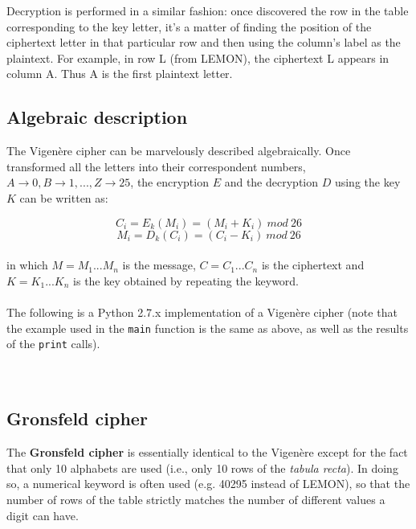 \documentclass[Lau,binding=0.6cm,oneside]{sapthesis}
\begin{document}
Decryption is performed in a similar fashion: once discovered the row in the table corresponding to the key letter, it's a matter of finding the position of the ciphertext letter in that particular row and then using the column's label as the plaintext. For example, in row \textsf{L} (from \textsf{LEMON}), the ciphertext \textsf{L} appears in column \textsf{A}. Thus \textsf{A} is the first plaintext letter.

\subsection{Algebraic description}
The Vigenère cipher can be marvelously described algebraically. Once transformed all the letters into their correspondent numbers, $A \rightarrow 0, B \rightarrow 1, ... , Z \rightarrow 25$, the encryption $E$ and the decryption $D$ using the key $K$ can be written as:

\begin{equation}
C_i=E_k{(M_i)}=(M_i + K_i) \ mod \ 26
\end{equation}
\begin{equation}
M_i=D_k{(C_i)}=(C_i - K_i) \ mod \ 26
\end{equation}
\ \\
in which $M = M_1 ... M_n$ is the message, $C = C_1 ... C_n$ is the ciphertext and $K = K_1 ... K_n$ is the key obtained by repeating the keyword.\\\\
The following is a \textsf{Python 2.7.x} implementation of a Vigenère cipher (note that the example used in the \texttt{main} function is the same as above, as well as the results of the \texttt{print} calls).\\\\
\ \\
\subsection{Gronsfeld cipher}
The \textbf{Gronsfeld cipher} is essentially identical to the Vigenère except for the fact that only 10 alphabets are used (i.e., only 10 rows of the \textit{tabula recta}). In doing so, a numerical keyword is often used (e.g. \textsf{40295} instead of \textsf{LEMON}), so that the number of rows of the table strictly matches the number of different values a digit can have.
\end{document}
